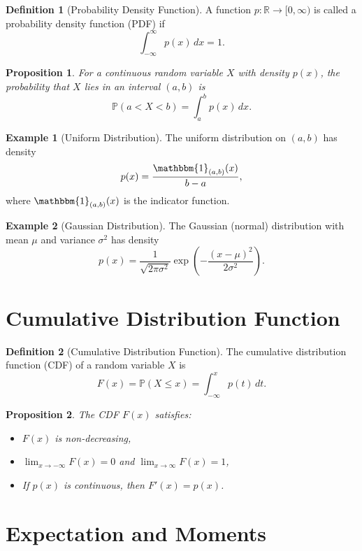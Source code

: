 \documentclass[12pt,oneside]{book}
\numberwithin{equation}{section}
\theoremstyle{definition}
\newtheorem{definition}{Definition}[section]
\newtheorem{example}{Example}[section]
\theoremstyle{plain}
\newtheorem{proposition}{Proposition}[section]
\theoremstyle{remark}
\newcommand{\R}{\mathbb{R}}
\newcommand{\Prob}{\mathbb{P}}
\newcommand{\ind}{\mathbbm{1}}
\begin{document}
\begin{definition}[Probability Density Function]
A function $p : \R \to [0,\infty)$ is called a probability density function (PDF) if
\[
\int_{-\infty}^{\infty} p(x)\,dx = 1.
\]
\end{definition}

\begin{proposition}
For a continuous random variable $X$ with density $p(x)$, the probability that $X$ lies in an interval $(a,b)$ is
\[
\Prob(a < X < b) = \int_a^b p(x)\,dx.
\]
\end{proposition}

\begin{example}[Uniform Distribution]
The uniform distribution on $(a,b)$ has density
\[
p(x) = \frac{\ind_{(a,b)}(x)}{b-a},
\]
where $\ind_{(a,b)}(x)$ is the indicator function.
\end{example}

\begin{example}[Gaussian Distribution]
The Gaussian (normal) distribution with mean $\mu$ and variance $\sigma^2$ has density
\[
p(x) = \frac{1}{\sqrt{2\pi\sigma^2}} \exp\left(-\frac{(x-\mu)^2}{2\sigma^2}\right).
\]
\end{example}

\section{Cumulative Distribution Function}

\begin{definition}[Cumulative Distribution Function]
The cumulative distribution function (CDF) of a random variable $X$ is
\[
F(x) = \Prob(X \leq x) = \int_{-\infty}^x p(t)\,dt.
\]
\end{definition}

\begin{proposition}
The CDF $F(x)$ satisfies:
\begin{itemize}
    \item $F(x)$ is non-decreasing,
    \item $\lim_{x \to -\infty} F(x) = 0$ and $\lim_{x \to \infty} F(x) = 1$,
    \item If $p(x)$ is continuous, then $F'(x) = p(x)$.
\end{itemize}
\end{proposition}

\section{Expectation and Moments}
\end{document}
